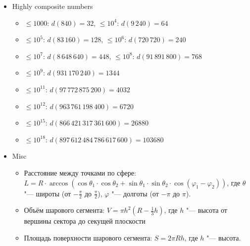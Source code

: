 \begin{itemize}
\item Highly composite numbers
\begin{itemize}
\item $\le 1000$: $d(840)=32$, $\le 10^4$: $d(9\,240)=64$
\item $\le 10^5$: $d(83\,160)=128$, $\le 10^6$: $d(720\,720)=240$
\item $\le 10^7$: $d(8\,648\,640)=448$, $\le 10^8$: $d(91\,891\,800)=768$
\item $\le 10^9$: $d(931\,170\,240)=1344$
\item $\le 10^{11}$: $d(97\,772\,875\,200)=4032$
\item $\le 10^{12}$: $d(963\,761\,198\,400)=6720$
\item $\le 10^{15}$: $d(866\,421\,317\,361\,600)=26880$
\item $\le 10^{18}$: $d(897\,612\,484\,786\,617\,600)=103680$
\end{itemize}

\item Misc
\begin{itemize}
\item Расстояние между точками по сфере: $L = R \cdot \arccos ( \cos \theta_1 \cdot \cos \theta_2 + \sin \theta_1 \cdot \sin \theta_2 \cdot \cos (\varphi_1 - \varphi_2) )$,
      где $\theta$ "--- широты (от $-\frac \pi 2$ до $\frac \pi 2$), $\varphi$ "--- долготы (от $-\pi$ до $\pi$).
\item Объём шарового сегмента: $V = \pi h^2 (R - \frac 1 3 h)$, где $h$ "--- высота от вершины сектора до секущей плоскости
\item Площадь поверхности шарового сегмента: $S=2\pi R h$, где $h$ "--- высота.
\end{itemize}


\end{itemize}
